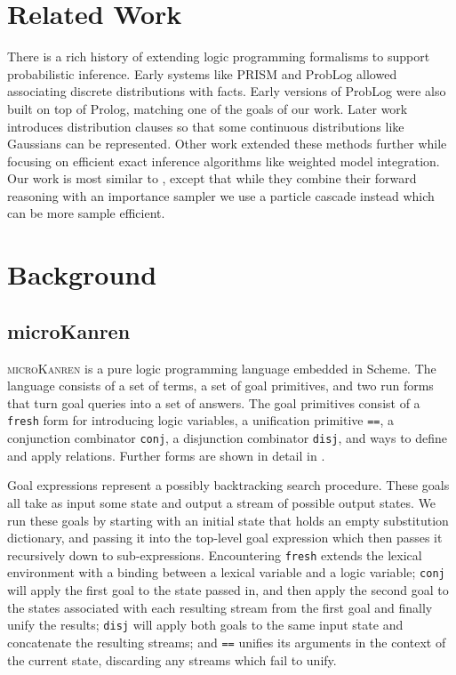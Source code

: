 \documentclass[
]{ceurart}
\begin{document}
\section{Related Work}

There is a rich history of extending logic programming formalisms to
support probabilistic inference. Early systems like
PRISM\cite{sato1997prism} and ProbLog\cite{de2007problog} allowed
associating discrete distributions with facts. Early versions of
ProbLog were also built on top of Prolog, matching one of the goals of
our work. Later work\cite{gutmann2010extending} introduces
distribution clauses so that some continuous distributions like
Gaussians can be represented. Other work extended these methods
further while focusing on efficient exact inference algorithms like
weighted model integration\cite{islam2012inference,
  belle2015probabilistic}. Our work is most similar to
\cite{gutmann2011magic}, except that while they combine their forward
reasoning with an importance sampler we use a particle cascade instead
which can be more sample efficient.

\section{Background}

\subsection{microKanren}

\textsc{microKanren}\cite{10.1145/2989225.2989230, daniel2018reasoned}
is a pure logic programming language embedded in Scheme. The language
consists of a set of terms, a set of goal primitives, and two run
forms that turn goal queries into a set of answers. The goal primitives
consist of a \texttt{fresh} form for introducing logic variables, a
unification primitive \texttt{==}, a conjunction combinator
\texttt{conj}, a disjunction combinator \texttt{disj}, and ways to
define and apply relations. Further forms are shown in detail in
.

Goal expressions represent a possibly backtracking search
procedure. These goals all take as input some state and output a
stream of possible output states. We run these goals by starting with
an initial state that holds an empty substitution dictionary, and
passing it into the top-level goal expression which then passes it
recursively down to sub-expressions. Encountering \texttt{fresh}
extends the lexical environment with a binding between a lexical
variable and a logic variable; \texttt{conj} will apply the first goal
to the state passed in, and then apply the second goal to the states
associated with each resulting stream from the first goal and finally
unify the results; \texttt{disj} will apply both goals to the same
input state and concatenate the resulting streams; and \texttt{==}
unifies its arguments in the context of the current state, discarding
any streams which fail to unify.
\end{document}

